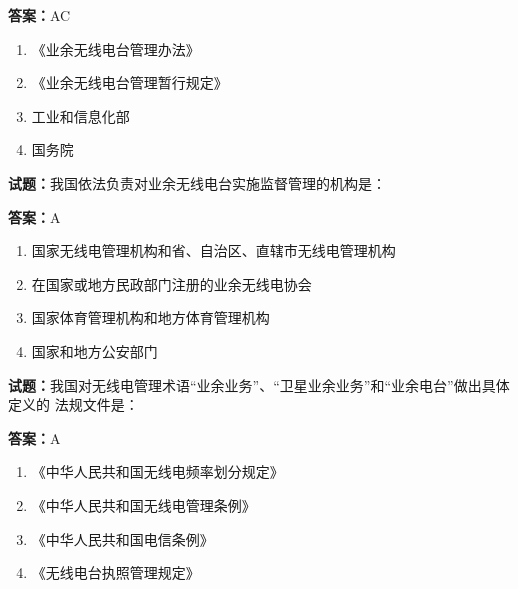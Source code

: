 \documentclass{ctexbook}
\begin{document}
\textbf{答案：}AC 

\begin{enumerate}[leftmargin=3em]
  \item 《业余无线电台管理办法》 

  \item 《业余无线电台管理暂行规定》 

  \item 工业和信息化部 

  \item 国务院 

\end{enumerate}





\vspace{1em}

\textbf{试题：}我国依法负责对业余无线电台实施监督管理的机构是： 

\textbf{答案：}A 

\begin{enumerate}[leftmargin=3em]
  \item 国家无线电管理机构和省、自治区、直辖市无线电管理机构 

  \item 在国家或地方民政部门注册的业余无线电协会 

  \item 国家体育管理机构和地方体育管理机构 

  \item 国家和地方公安部门 

\end{enumerate}





\vspace{1em}

\textbf{试题：}我国对无线电管理术语“业余业务”、“卫星业余业务”和“业余电台”做出具体定义的
法规文件是： 

\textbf{答案：}A 

\begin{enumerate}[leftmargin=3em]
  \item 《中华人民共和国无线电频率划分规定》 

  \item 《中华人民共和国无线电管理条例》 

  \item 《中华人民共和国电信条例》 

  \item 《无线电台执照管理规定》 

\end{enumerate}
\end{document}
